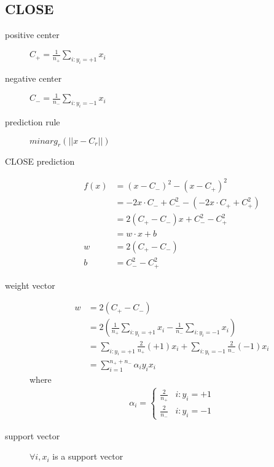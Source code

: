 \documentclass[12pt]{article}
\begin{document}
\begin{multicols}{2}
  \section{CLOSE}
  \begin{description}
  \item[positive center] $C_+ = \frac{1}{n_+}\sum_{i:y_i=+1}x_i$
  \item[negative center] $C_- = \frac{1}{n_-}\sum_{i:y_i=-1}x_i$
  \item[prediction rule] $minarg_r (||x-C_r||)$
  \item[CLOSE prediction]
    \begin{align*}
      f(x)
      &= (x - C_-)^2 - (x - C_+)^2 \\
      &= -2x \cdot C_- + C_-^2 - (-2x \cdot C_+ + C_+^2) \\
      &=  2 (C_+ - C_-) x + C_-^2 - C_+^2 \\
      &=  w \cdot x + b \\
      w &=  2 (C_+ - C_-) \\
      b &=  C_-^2 - C_+^2 
    \end{align*}
  \item[weight vector]
    \begin{align*}
      w &=  2 (C_+ - C_-) \\
      &= 2 (\frac{1}{n_+}\sum_{i:y_i=+1}x_i - \frac{1}{n_-}\sum_{i:y_i=-1}x_i) \\
      &= \sum_{i:y_i=+1} \frac{2}{n_+} (+1) x_i + \sum_{i:y_i=-1} \frac{2}{n_-} (-1) x_i \\
      &= \sum_{i=1}^{n_+ + n_-} \alpha_i y_i x_i
    \end{align*}
    where
    \begin{align*}
      \alpha_i =
      \begin{cases}
        \frac{2}{n_+} & i:y_i=+1 \\
        \frac{2}{n_-} & i:y_i=-1
      \end{cases}
    \end{align*}
  \item[support vector] $\forall i, x_i$ is a support vector 
  \end{description}


\end{multicols}
\end{document}

